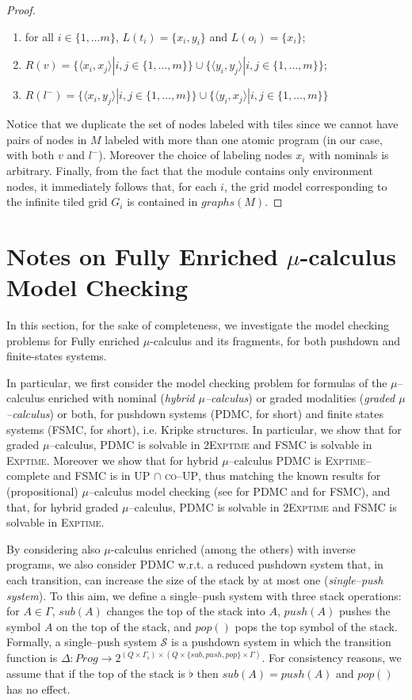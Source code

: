 \documentclass{LMCS}
\theoremstyle{plain}
\def \bottom        {\flat}
\def \coUP          {\textsc{co--UP}\xspace}
\def \EXPTIME       {\textsc{Exptime}\xspace}
\def \FSMC          {\textsc{FSMC}\xspace}
\def \Gb            {\Gamma_{\bottom}}
\def \PDMC          {\textsc{PDMC}\xspace}
\def \S             {\mathcal{S}}
\def \TWOEXPTIME    {\textsc{2Exptime}\xspace}
\def \UP            {{\sc UP}}
\def \UP            {\textsc{UP}\xspace}
\newcommand \tpl[1] {\langle #1 \rangle}
\begin{document}
\begin{proof}
\begin{enumerate}[$\bullet$]
\item
for all $i \in \{1, \ldots m\}$, $L(t_i) = \{x_i, y_i\}$ and
$L(o_i) = \{x_i\}$;

\item
$R(v) = \{\tpl{x_i, x_j} | i,j \in \{1, \ldots, m\}\} \cup
\{\tpl{y_i, y_j} | i,j \in \{1, \ldots, m\}\}$;

\item
$R(l^-) = \{\tpl{x_i, y_j} | i,j \in \{1, \ldots, m\}\} \cup
\{\tpl{y_i, x_j} | i,j \in \{1, \ldots, m\}\}$
\end{enumerate}

Notice that we duplicate the set of nodes labeled with tiles since
we cannot have pairs of nodes in $M$ labeled with more than one
atomic program (in our case, with both $v$ and $l^-$). Moreover
the choice of labeling nodes $x_i$ with nominals is arbitrary.
Finally, from the fact that the module contains only environment
nodes, it immediately follows that, for each $i$, the grid model
corresponding to the infinite tiled grid $G_i$ is contained in
$graphs(M)$.
\end{proof}

\section{Notes on Fully Enriched $\mu$-calculus Model Checking}\label{sec:ModelChecking}
In this section, for the sake of completeness, we investigate the model
checking problems for Fully enriched $\mu$-calculus and its fragments, for both
pushdown and finite-states systems.

In particular, we first consider the model checking problem for formulas of the
$\mu$--calculus enriched with nominal (\emph{hybrid $\mu$--calculus}) or graded
modalities (\emph{graded $\mu$--calculus}) or both, for pushdown systems
(\PDMC, for short) and finite states systems (\FSMC, for short), i.e. Kripke
structures. In particular, we show that for graded $\mu$--calculus, \PDMC is
solvable in \TWOEXPTIME and \FSMC is solvable in \EXPTIME. Moreover we show
that for hybrid $\mu$--calculus \PDMC is \EXPTIME--complete and \FSMC is in \UP
$\cap$ \coUP, thus matching the known results for (propositional)
$\mu$--calculus model checking (see \cite{Wal96} for \PDMC and \cite{Wil01} for
\FSMC), and that, for hybrid graded $\mu$--calculus, \PDMC is solvable in
\TWOEXPTIME and \FSMC is solvable in \EXPTIME.

By considering also $\mu$-calculus enriched (among the others) with inverse
programs, we also consider \PDMC w.r.t. a reduced pushdown system that, in each
transition, can increase the size of the stack by at most one
(\emph{single--push system}). To this aim, we define a single--push system with
three stack operations: for $A \in \Gamma$, $sub(A)$ changes the top of the
stack into $A$, $push(A)$ pushes the symbol $A$ on the top of the stack, and
$pop()$ pops the top symbol of the stack. Formally, a single--push system $\S$
is a pushdown system in which the transition function is $\Delta : Prog
\rightarrow 2^{(Q \times \Gb) \times (Q \times \{sub,push,pop\} \times
\Gamma)}$. For consistency reasons, we assume that if the top of the stack is
$\bottom$ then $sub(A) = push(A)$ and $pop()$ has no effect.
\end{document}

